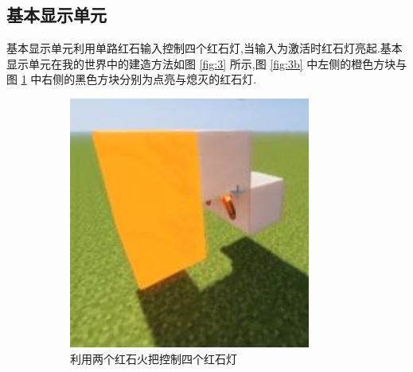 \documentclass[UTF8,12pt,punct=kaiming,fontset=none]{ctexart}
\begin{document}
    \subsection{基本显示单元}
    基本显示单元利用单路红石输入控制四个红石灯,当输入为激活时红石灯亮起.基本显示单元在我的世界中的建造方法如图 \ref{fig:3} 所示,图 \ref{fig:3b} 中左侧的橙色方块与图 \ref{fig:3a} 中右侧的黑色方块分别为点亮与熄灭的红石灯.

    \begin{figure}[H]
        \centering
        \begin{subfigure}{0.2\linewidth}
            \centering
            \includegraphics[width=\linewidth]{figures/3a.png}
            \caption{利用两个红石火把控制四个红石灯}
            \label{fig:3a}
        \end{subfigure}
        \hspace{1cm}
        \begin{subfigure}{0.25\linewidth}
            \centering

\end{subfigure}
\end{figure}
\end{document}
